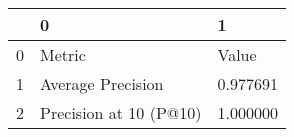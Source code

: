 \begin{tabular}{lll}
\toprule
 & 0 & 1 \\
\midrule
0 & Metric & Value \\
1 & Average Precision & 0.977691 \\
2 & Precision at 10 (P@10) & 1.000000 \\
\bottomrule
\end{tabular}
